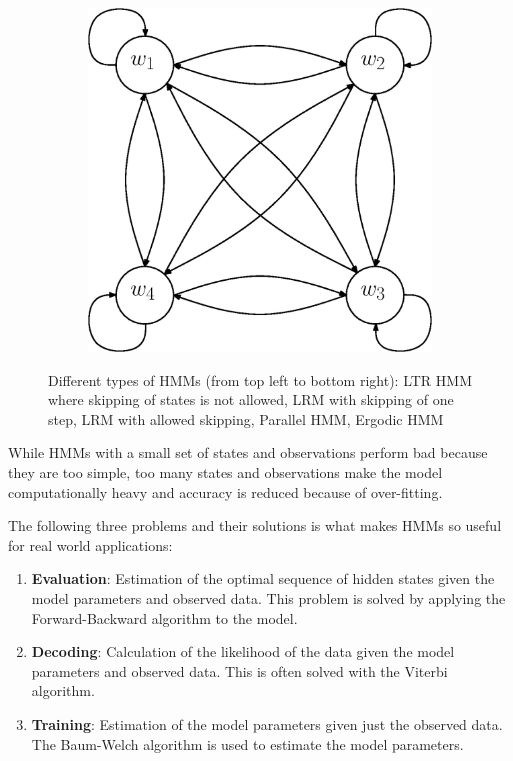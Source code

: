 \documentclass[a4paper, oneside]{csthesis}
\begin{document}
\begin{figure}
        \begin{subfigure}[b]{0.25\textwidth}
                \centering
                \includegraphics[width=\textwidth]{figures/hmm-ltr4.eps}
                \caption{}
                \label{fig:hmm1}
        \end{subfigure}%



        \caption{Different types of HMMs (from top left to bottom right): LTR HMM where skipping of states is not allowed, LRM with skipping of one step, LRM with allowed skipping, Parallel HMM, Ergodic HMM}\label{fig:markov-models}
\end{figure}



While HMMs with a small set of states and observations perform bad because they are too simple, too many states and observations make the model computationally heavy and accuracy is reduced because of over-fitting.

The following three problems and their solutions is what makes HMMs so useful for real world applications:
\begin{enumerate}
\item \textbf{Evaluation}: Estimation of the optimal sequence of hidden states given the model parameters and observed data. This problem is solved by applying the Forward-Backward algorithm to the model.
\item \textbf{Decoding}: Calculation of the likelihood of the data given the model parameters and observed data. This is often solved with the Viterbi algorithm.
\item \textbf{Training}: Estimation of the model parameters given just the observed data. The Baum-Welch algorithm is used to estimate the model parameters.
\end{enumerate}
\end{document}

